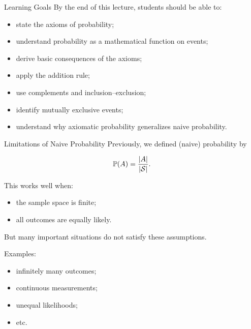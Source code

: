 \setcounter{framenumber}{0}


\begin{frame}
  \titlepage
\end{frame}

\begin{frame}{Learning Goals}
By the end of this lecture, students should be able to:

\begin{itemize}
    \item state the axioms of probability;
    \item understand probability as a mathematical function on events;
    \item derive basic consequences of the axioms;
    \item apply the addition rule;
    \item use complements and inclusion--exclusion;
    \item identify mutually exclusive events;
    \item understand why axiomatic probability generalizes naive probability.
\end{itemize}
\end{frame}


\begin{frame}{Limitations of Naive Probability}
Previously, we defined (naive) probability by

\[
\mathbb{P}(A)=\frac{|A|}{|\mathcal{S}|}.
\]

This works well when:
\begin{itemize}
    \item the sample space is finite;
    \item all outcomes are equally likely.
\end{itemize}

\vspace{0.3cm}

But many important situations do not satisfy these assumptions.

\vspace{0.25cm}

Examples:
\begin{itemize}
    \item infinitely many outcomes;
    \item continuous measurements;
    \item unequal likelihoods;
    \item etc.
\end{itemize}
\end{frame}

